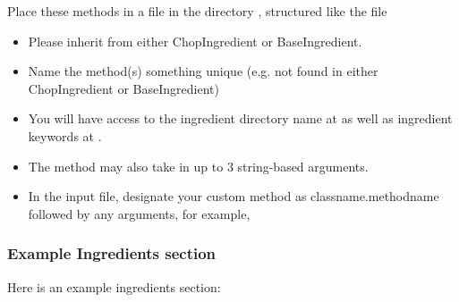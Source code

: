 \documentclass[letterpaper,10pt,english]{sphinxmanual}
\begin{document}
Place these methods in a file in the directory , structured like the file 
\begin{itemize}
\item {} 
Please inherit from either ChopIngredient or BaseIngredient.

\item {} 
Name the method(s) something unique (e.g. not found in either ChopIngredient or BaseIngredient)

\item {} 
You will have access to the ingredient directory name at  as well as ingredient keywords at .

\item {} 
The method may also take in up to 3 string-based arguments.

\item {} 
In the input file, designate your custom method as classname.methodname followed by any arguments, for example, 

\end{itemize}


\subsubsection{Example Ingredients section}
\label{3_0_inputfile:example-ingredients-section}
Here is an example ingredients section:
\end{document}
